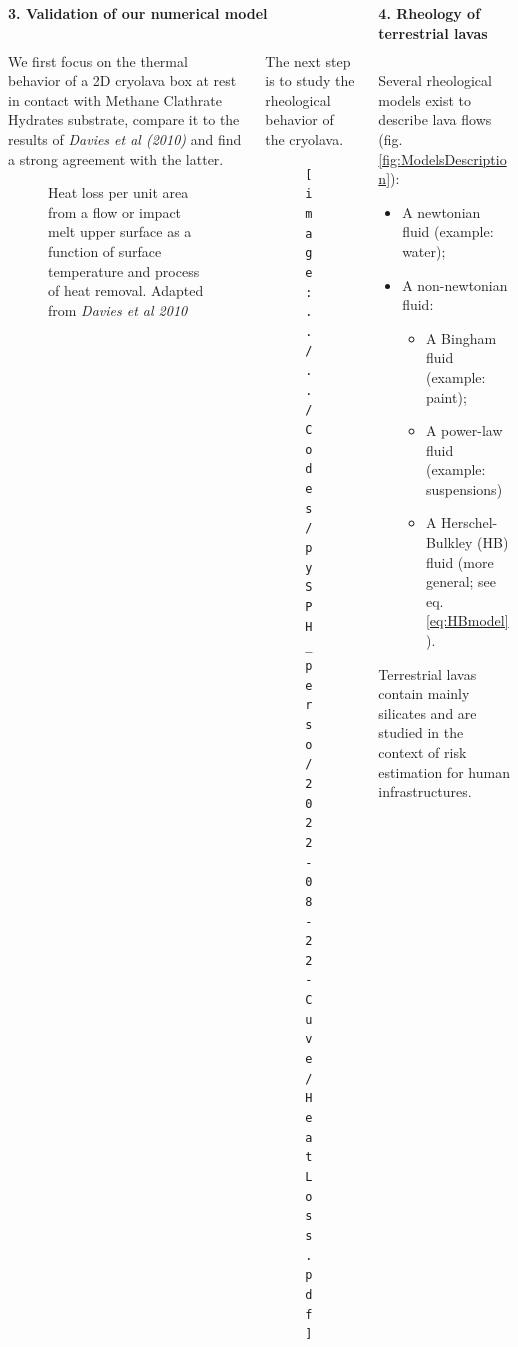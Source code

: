 \documentclass[final,t]{beamer}
\let\olditem\item
\renewcommand\item{\olditem\justifying}
\begin{document}
\begin{frame}
\begin{columns}[t]
\begin{column}{.495\linewidth}
  \begin{block}{\textbf{3. Validation of our numerical model}}
  \begin{columns}
  \begin{column}{0.34\textwidth}\rightskip=0pt\leftskip=0pt
  We first focus on the thermal behavior of a 2D cryolava box at rest in contact with Methane Clathrate Hydrates substrate, compare it to the results of \emph{Davies et al (2010)} \cite{Davies2010} and find a strong agreement with the latter.
  
  \begin{figure}[h]
  	\caption{Heat loss per unit area from a ﬂow or impact melt upper surface as a function of surface temperature and process
of heat removal. Adapted from \emph{Davies et al 2010}}
  \end{figure}
  \end{column}
  \begin{column}{0.62\textwidth}
  The next step is to study the rheological behavior of the cryolava.
  \begin{figure}[!h]
  	\centering
  	\texttt{[image: ../../Codes/pySPH\_perso/2022-08-22-Cuve/HeatLoss.pdf]} 
  \end{figure}
  \end{column}
  \end{columns}
  \end{block}
  
  \end{column}

\begin{column}{.495\linewidth}
 
 
  \begin{block}{\textbf{4. Rheology of terrestrial lavas}}
  \rightskip=0pt\leftskip=0pt
  \begin{columns}
  \begin{column}{0.49\textwidth}\rightskip=0pt\leftskip=0pt
  Several rheological models exist to describe lava flows (fig. \ref{fig:ModelsDescription}):
  \begin{itemize}
  	\item A newtonian fluid (example: water);
  	\item A non-newtonian fluid:
  	\begin{itemize}
  		\item A Bingham fluid (example: paint);
  		\item A power-law fluid (example: suspensions)
  		\item A Herschel-Bulkley (HB) fluid (more general; see eq. \eqref{eq:HBmodel}).
  	\end{itemize}
  \end{itemize}
  Terrestrial lavas contain mainly silicates and are studied in the context of risk estimation for human infrastructures.
  

\end{column}
\end{columns}
\end{block}
\end{column}
\end{columns}
\end{frame}
\end{document}
